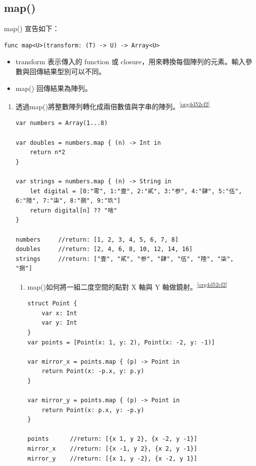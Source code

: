 \documentclass[a4paper,12pt]{article}
\begin{document}
\subsection{map()}
\label{sec:org2c1c747}
map() 宣告如下：\\
\lstset{breaklines=true,language=swift,label= ,caption= ,captionpos=b,firstnumber=1,numbers=left}
\begin{lstlisting}
func map<U>(transform: (T) -> U) -> Array<U>
\end{lstlisting}
\begin{itemize}
\item transform 表示傳入的 function 或 closure，用來轉換每個陣列的元素。輸入參數與回傳結果型別可以不同。\\
\item map() 回傳結果為陣列。\\
\end{itemize}
\begin{enumerate}
\item 透過map()將整數陣列轉化成兩倍數值與字串的陣列。\textsuperscript{\ref{org4d52cf2}}
\label{sec:orgdd80f1d}
\lstset{breaklines=true,language=swift,label= ,caption= ,captionpos=b,firstnumber=1,numbers=left}
\begin{lstlisting}
var numbers = Array(1...8)

var doubles = numbers.map { (n) -> Int in
    return n*2
}

var strings = numbers.map { (n) -> String in
    let digital = [0:"零", 1:"壹", 2:"貳", 3:"参", 4:"肆", 5:"伍", 6:"陸", 7:"柒", 8:"捌", 9:"玖"]
    return digital[n] ?? "啥"
}

numbers     //return: [1, 2, 3, 4, 5, 6, 7, 8]
doubles     //return: [2, 4, 6, 8, 10, 12, 14, 16]
strings     //return: ["壹", "貳", "参", "肆", "伍", "陸", "柒", "捌"]

\end{lstlisting}
\begin{enumerate}
\item map()如何將一組二度空間的點對 X 軸與 Y 軸做鏡射。\textsuperscript{\ref{org4d52cf2}}
\label{sec:orgbdaca93}
\lstset{breaklines=true,language=swift,label= ,caption= ,captionpos=b,firstnumber=1,numbers=left}
\begin{lstlisting}
struct Point {
    var x: Int
    var y: Int
}
var points = [Point(x: 1, y: 2), Point(x: -2, y: -1)]

var mirror_x = points.map { (p) -> Point in
    return Point(x: -p.x, y: p.y)
}

var mirror_y = points.map { (p) -> Point in
    return Point(x: p.x, y: -p.y)
}

points      //return: [{x 1, y 2}, {x -2, y -1}]
mirror_x    //return: [{x -1, y 2}, {x 2, y -1}]
mirror_y    //return: [{x 1, y -2}, {x -2, y 1}]

\end{lstlisting}
\end{enumerate}
\end{enumerate}
\end{document}
